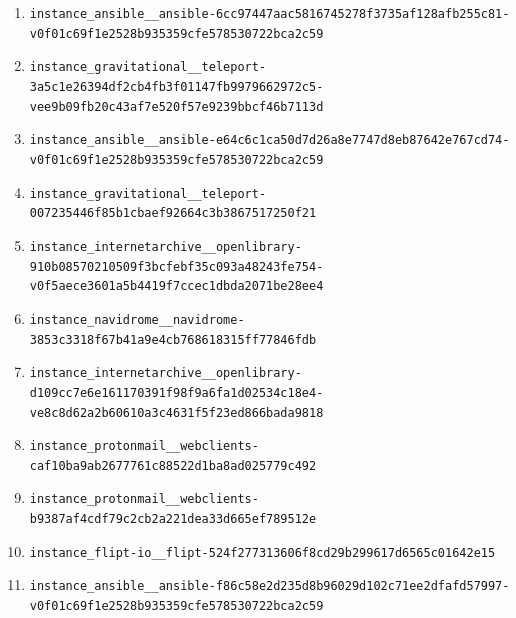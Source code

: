 \begin{enumerate}
\item \texttt{instance\_\allowbreak{}ansible\_\allowbreak{}\_\allowbreak{}ansible-\allowbreak{}6cc97447aac581\allowbreak{}6745278f3735af\allowbreak{}128afb255c81-\allowbreak{}v0f01c69f1e252\allowbreak{}8b935359cfe578\allowbreak{}530722bca2c59}
\item \texttt{instance\_\allowbreak{}gravitational\_\allowbreak{}\_\allowbreak{}teleport-\allowbreak{}3a5c1e26394df2\allowbreak{}cb4fb3f01147fb\allowbreak{}9979662972c5-\allowbreak{}vee9b09fb20c43\allowbreak{}af7e520f57e923\allowbreak{}9bbcf46b7113d}
\item \texttt{instance\_\allowbreak{}ansible\_\allowbreak{}\_\allowbreak{}ansible-\allowbreak{}e64c6c1ca50d7d\allowbreak{}26a8e7747d8eb8\allowbreak{}7642e767cd74-\allowbreak{}v0f01c69f1e252\allowbreak{}8b935359cfe578\allowbreak{}530722bca2c59}
\item \texttt{instance\_\allowbreak{}gravitational\_\allowbreak{}\_\allowbreak{}teleport-\allowbreak{}007235446f85b1\allowbreak{}cbaef92664c3b3\allowbreak{}867517250f21}
\item \texttt{instance\_\allowbreak{}internetarchiv\allowbreak{}e\_\allowbreak{}\_\allowbreak{}openlibrary-\allowbreak{}910b0857021050\allowbreak{}9f3bcfebf35c09\allowbreak{}3a48243fe754-\allowbreak{}v0f5aece3601a5\allowbreak{}b4419f7ccec1db\allowbreak{}da2071be28ee4}
\item \texttt{instance\_\allowbreak{}navidrome\_\allowbreak{}\_\allowbreak{}navidrome-\allowbreak{}3853c3318f67b4\allowbreak{}1a9e4cb7686183\allowbreak{}15ff77846fdb}
\item \texttt{instance\_\allowbreak{}internetarchiv\allowbreak{}e\_\allowbreak{}\_\allowbreak{}openlibrary-\allowbreak{}d109cc7e6e1611\allowbreak{}70391f98f9a6fa\allowbreak{}1d02534c18e4-\allowbreak{}ve8c8d62a2b606\allowbreak{}10a3c4631f5f23\allowbreak{}ed866bada9818}
\item \texttt{instance\_\allowbreak{}protonmail\_\allowbreak{}\_\allowbreak{}webclients-\allowbreak{}caf10ba9ab2677\allowbreak{}761c88522d1ba8\allowbreak{}ad025779c492}
\item \texttt{instance\_\allowbreak{}protonmail\_\allowbreak{}\_\allowbreak{}webclients-\allowbreak{}b9387af4cdf79c\allowbreak{}2cb2a221dea33d\allowbreak{}665ef789512e}
\item \texttt{instance\_\allowbreak{}flipt-\allowbreak{}io\_\allowbreak{}\_\allowbreak{}flipt-\allowbreak{}524f277313606f\allowbreak{}8cd29b299617d6\allowbreak{}565c01642e15}
\item \texttt{instance\_\allowbreak{}ansible\_\allowbreak{}\_\allowbreak{}ansible-\allowbreak{}f86c58e2d235d8\allowbreak{}b96029d102c71e\allowbreak{}e2dfafd57997-\allowbreak{}v0f01c69f1e252\allowbreak{}8b935359cfe578\allowbreak{}530722bca2c59}

\end{enumerate}
